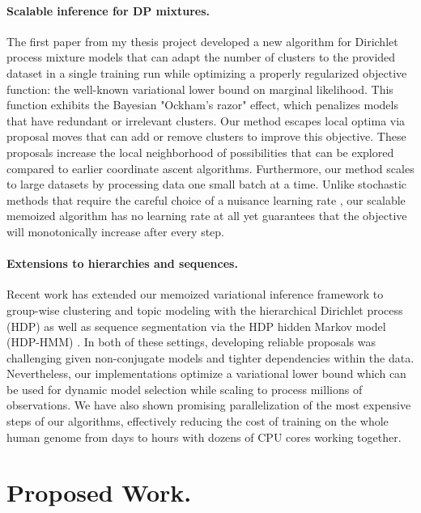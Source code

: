 \documentclass[11pt,letterpaper,sans]{article}
\begin{document}
\paragraph{Scalable inference for DP mixtures.}
The first paper from my thesis project \cite{hughes:moVB} developed a new algorithm for Dirichlet process mixture models that can adapt the number of clusters to the provided dataset in a single training run while optimizing a properly regularized objective function: the well-known variational lower bound on marginal likelihood. This function exhibits the Bayesian "Ockham's razor" effect, which penalizes models that have redundant or irrelevant clusters. Our method escapes local optima via proposal moves that can add or remove clusters to improve this objective. These proposals increase the local neighborhood of possibilities that can be explored compared to earlier coordinate ascent algorithms. Furthermore, our method scales to large datasets by processing data one small batch at a time. Unlike stochastic methods that require the careful choice of a nuisance learning rate \cite{hoffman:svi}, our scalable memoized algorithm has no learning rate at all yet guarantees that the objective will monotonically increase after every step.

\paragraph{Extensions to hierarchies and sequences.}
Recent work has extended our memoized variational inference framework to group-wise clustering and topic modeling with the hierarchical Dirichlet process (HDP) \cite{hughes:hdpreliable} as well as sequence segmentation via the HDP hidden Markov model (HDP-HMM) \cite{hughes:hdphmm}. In both of these settings, developing reliable proposals was challenging given non-conjugate models and tighter dependencies within the data. Nevertheless, our implementations optimize a variational lower bound which can be used for dynamic model selection while scaling to process millions of observations. We have also shown promising parallelization of the most expensive steps of our algorithms, effectively reducing the cost of training on the whole human genome from days to hours with dozens of CPU cores working together.

\section{Proposed Work.}
\end{document}
